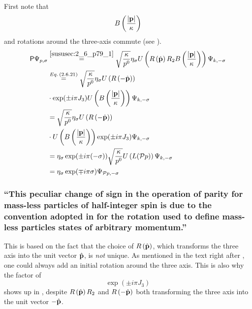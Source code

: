 \subsubsection{ }
First note that \[B\left(\dfrac{\abs{\mathbf{p}}}{\kappa}\right)\] and rotations around the three-axis commute (see ).
\begin{align*} 
	\mathsf{P}\Psi_{p,\sigma}&\overset{\ref{sususec:2_6_p79_1}}{=}\sqrt{\dfrac{\kappa}{p^0}}\eta_\sigma U\left( R\left(\hat{\mathbf{p}}\right)R_2  B\left(\dfrac{\abs{\mathbf{p}}}{\kappa}\right)\right)\Psi_{k,-\sigma}\\
	&\overset{Eq.\,({2.6.21})}{=}\sqrt{\dfrac{\kappa}{p^0}}\eta_\sigma U\left( R\left(-\hat{\mathbf{p}}\right)\right)\\
	&\cdot\exp(\pm i \pi J_3)U\left(  B\left(\dfrac{\abs{\mathbf{p}}}{\kappa}\right)\right)\Psi_{k,-\sigma}\\
	&=\sqrt{\dfrac{\kappa}{p^0}}\eta_\sigma U\left( R\left(-\hat{\mathbf{p}}\right)\right)\\
	&\cdot U\left(  B\left(\dfrac{\abs{\mathbf{p}}}{\kappa}\right)\right)\exp(\pm i \pi J_3)\Psi_{k,-\sigma}\\
	&=\eta_\sigma \exp(\pm i \pi (-\sigma)) \sqrt{\dfrac{\kappa}{p^0}}U\left(L(\mathcal{\mathcal{P}} p)\right)\Psi_{k,-\sigma}\\
	&=\eta_\sigma \exp(\mp i \pi \sigma) \Psi_{\mathcal{\mathcal{P}} p,-\sigma}
\end{align*}

\subsubsection{\enquote{This peculiar change of sign in the operation of parity for mass-less particles of half-integer spin is due to the convention adopted in  for the rotation used to define mass-less particles states of arbitrary momentum.} }
This is based on the fact that the choice of $R\left(\hat{\mathbf{p}}\right)$, which transforms the three axis into the unit vector $\hat{\mathbf{p}}$, is \emph{not} unique. As mentioned in the text right after , one could always add an initial rotation around the three axis. This is also why the factor of \[\exp(\pm i \pi J_3)\] shows up in , despite $R\left(\hat{\mathbf{p}}\right)R_2$ and $R\left(-\hat{\mathbf{p}}\right)$ both transforming the three axis into the unit vector $-\hat{\mathbf{p}}$.

